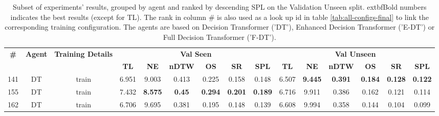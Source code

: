 \begin{table}
\centering
\caption{\label{tab:normalized_visual_features}Subset of experiments' results, grouped by agent and ranked by descending SPL on the Validation Unseen split. 	extbf{Bold} numbers indicates the best results (except for TL). The rank in column \# is also used as a look up id in table \ref{tab:all-configs-final} to link the corresponding training configuration.     \newline The agents are based on Decision Transformer ('DT'), Enhanced Decision Transformer ('E-DT') or Full Decision Transformer ('F-DT').}
\begin{tabular}{@{\hskip3pt}c@{\hskip3pt}c@{\hskip3pt}c@{\hskip3pt}c@{\hskip3pt}c@{\hskip3pt}c@{\hskip3pt}c@{\hskip3pt}c@{\hskip3pt}c@{\hskip3pt}c@{\hskip3pt}c@{\hskip3pt}c@{\hskip3pt}c@{\hskip3pt}c@{\hskip3pt}c}
\toprule
\textbf{\#} & \textbf{Agent} & \textbf{Training Details} & \multicolumn{6}{c}{\textbf{Val Seen}} & \multicolumn{6}{c}{\textbf{Val Unseen}} \\
 \textbf{~} &     \textbf{~} &                \textbf{~} &       \textbf{TL} &     \textbf{NE} &  \textbf{nDTW} &     \textbf{OS} &     \textbf{SR} &    \textbf{SPL} &         \textbf{TL} &     \textbf{NE} &   \textbf{nDTW} &     \textbf{OS} &     \textbf{SR} &    \textbf{SPL} \\
\midrule
        141 &             DT &                     train &             6.951 &           9.003 &          0.413 &           0.225 &           0.158 &           0.148 &               6.507 &  \textbf{9.445} &  \textbf{0.391} &  \textbf{0.184} &  \textbf{0.128} &  \textbf{0.122} \\
        155 &             DT &                     train &             7.432 &  \textbf{8.575} &  \textbf{0.45} &  \textbf{0.294} &  \textbf{0.201} &  \textbf{0.189} &               6.716 &           9.911 &           0.386 &           0.162 &           0.121 &           0.114 \\
        162 &             DT &                     train &             6.706 &           9.695 &          0.381 &           0.195 &           0.148 &           0.139 &               6.608 &           9.994 &           0.358 &           0.144 &           0.104 &           0.099 \\
\bottomrule
\end{tabular}
\end{table}

